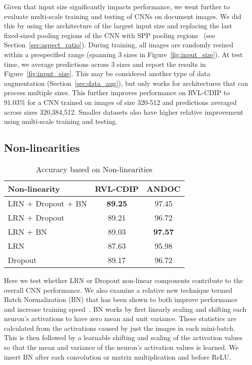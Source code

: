 \documentclass[10pt, conference, compsocconf]{IEEEtran}
\newcommand{\squeezeup}{\vspace{-2.5mm}}
\begin{document}
Given that input size significantly impacts performance, we went further to evaluate multi-scale training and testing of CNNs on document images.
We did this by using the architecture of the largest input size and replacing the last fixed-sized pooling regions of the CNN with SPP pooling regions~\cite{he15spatial} (see Section~\ref{sec:aspect_ratio}).
During training, all images are randomly resized within a prespecified range (spanning 3 sizes in Figure~\ref{fig:input_size}).
At test time, we average predictions across 3 sizes and report the results in Figure~\ref{fig:input_size}.
This may be considered another type of data augmentation (Section~\ref{sec:data_aug}), but only works for architectures that can process multiple sizes.
This further improves performance on RVL-CDIP to 91.03\% for a CNN trained on images of size 320-512 and predictions averaged across sizes 320,384,512.
Smaller datasets also have higher relative improvement using multi-scale training and testing.



\subsection{Non-linearities}

\begin{table}
\centering
\begin{tabular}{l|c|c}

Non-linearity           & RVL-CDIP          & ANDOC    \\
\hline
LRN + Dropout + BN      &  \textbf{89.25}   & 97.45    \\
LRN + Dropout           &  89.21   & 96.72    \\
LRN + BN                &  89.03            & \textbf{97.57}    \\
LRN                     &  87.63            & 95.98    \\
Dropout                 &  89.17  & 96.72    \\
\end{tabular}

\caption{Accuracy based on Non-linearities}
\label{tab:nonlinear}
\squeezeup
\squeezeup
\squeezeup
\end{table}

Here we test whether LRN or Dropout non-linear components contribute to the overall CNN performance.
We also examine a relative new technique termed Batch Normalization (BN) that has been shown to both improve performance and increase training speed~\cite{ioffe15}.
BN works by first linearly scaling and shifting each neuron's activations to have zero mean and unit variance.
These statistics are calculated from the activations caused by just the images in each mini-batch.
This is then followed by a learnable shifting and scaling of the activation values so that the mean and variance of the neuron's activation values is learned.
We insert BN after each convolution or matrix multiplication and before ReLU.
\end{document}
